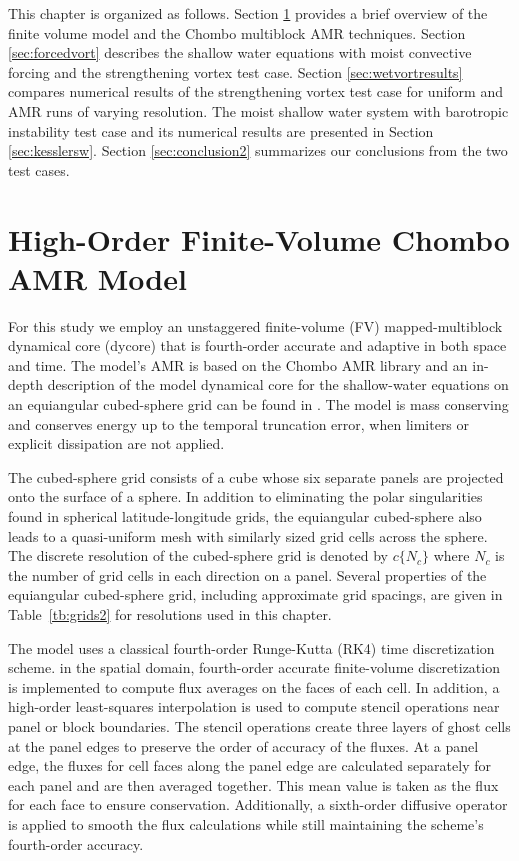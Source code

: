 \documentclass{ametsoc}
\begin{document}
This chapter is organized as follows. Section \ref{sec:modelintro} provides a brief overview
of the finite volume model and the Chombo multiblock AMR techniques.
Section \ref{sec:forcedvort} describes the shallow water equations
with moist convective forcing and the strengthening vortex test case.
Section \ref{sec:wetvortresults} compares numerical results of the strengthening vortex
test case for uniform and AMR runs of varying resolution. The
 \cite{zerroukat2015moist} moist shallow water system with
 barotropic instability test case and its numerical results
 are presented in Section \ref{sec:kesslersw}.  Section \ref{sec:conclusion2} summarizes our
 conclusions from the two test cases.

\section{High-Order Finite-Volume Chombo AMR Model}
\label{sec:modelintro} 
  For this study we employ an unstaggered finite-volume (FV) mapped-multiblock 
  dynamical core (dycore) that is fourth-order accurate and adaptive in both 
  space and time. The model's AMR is based on the Chombo AMR 
  library \citep{Adams:2015gd} and an in-depth description of the model 
  dynamical core for the shallow-water equations on an equiangular cubed-sphere 
  grid can be found in \cite{mccorquodale2015adaptive}. The model is mass 
  conserving and conserves energy up to the temporal truncation error, when 
  limiters or explicit dissipation are not applied. 
  
  The cubed-sphere grid consists of a cube whose six separate panels are 
  projected onto the surface of a sphere. In addition to eliminating the polar 
  singularities found in spherical latitude-longitude grids, the equiangular cubed-sphere 
  also leads to a quasi-uniform mesh with similarly sized grid cells across the sphere. 
  The discrete resolution of the cubed-sphere grid is denoted by $c\{N_c\}$ 
  where $N_c$ is the number of grid cells in each direction on a panel. Several 
  properties of the equiangular cubed-sphere grid, including approximate grid 
  spacings, are given in Table~\ref{tb:grids2} for resolutions used in this chapter.
  
  The model uses a classical fourth-order Runge-Kutta (RK4) 
  time discretization scheme. in the spatial domain, fourth-order 
  accurate finite-volume discretization is implemented to compute 
  flux averages on the faces of each cell. In addition, a high-order 
  least-squares interpolation is used to compute stencil operations near panel 
  or block boundaries. The stencil operations create three layers of ghost cells 
  at the panel edges to preserve the order of accuracy of the fluxes. 
  At a panel edge, the fluxes for cell faces along the panel edge are calculated 
  separately for each panel and are then averaged together. This mean value 
  is taken as the flux for each face to ensure conservation. Additionally, a sixth-order 
  diffusive operator is applied to smooth the flux calculations while still 
  maintaining the scheme's fourth-order accuracy. 
  
\end{document}
